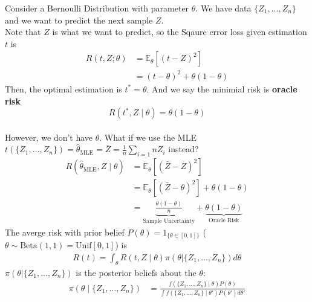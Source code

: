 \documentclass[11pt]{elegantbook}
\begin{document}
\begin{example}\label{ex:square_loss}
    Consider a Bernoulli Distribution with parameter $\theta$. We have data $\{Z_1,...,Z_n\}$ and we want to predict the next sample $Z$.\\
    Note that $Z$ is what we want to predict, so the Sqaure error loss given estimation $t$ is
    \begin{equation}
        \begin{aligned}
            R(t,Z;\theta)&=\mathbb{E}_\theta[(t-Z)^2]\\
            &=(t-\theta)^2+\theta(1-\theta)
        \end{aligned}
        \nonumber
    \end{equation}
    Then, the optimal estimation is $t^*=\theta$. And we say the minimial risk is \textbf{oracle risk} $$R(t^*,Z\mid\theta)=\theta(1-\theta)$$\\
    However, we don't have $\theta$. What if we use the MLE $t(\{Z_1,...,Z_n\})=\hat{\theta}_\text{MLE}=\bar{Z}=\frac{1}{n}\sum_{i=1}{n}Z_i$ instead?
    \begin{equation}
        \begin{aligned}
            R(\hat{\theta}_\text{MLE},Z\mid \theta)&=\mathbb{E}_\theta[(\bar{Z}-Z)^2]\\
            &=\mathbb{E}_\theta[(\bar{Z}-\theta)^2]+\theta(1-\theta)\\
            &=\underbrace{\frac{\theta(1-\theta)}{n}}_\text{Sample Uncertainty}+\underbrace{\theta(1-\theta)}_\text{Oracle Risk}
        \end{aligned}
        \nonumber
    \end{equation}
    The averge risk with prior belief $P(\theta)=1_{\{\theta\in[0,1]\}}$ ($\theta\sim \text{Beta}(1,1)=\text{Unif}[0,1]$) is
    \begin{equation}
        \begin{aligned}
            R(t)=\int_\theta R(t,Z\mid \theta) \pi(\theta| \{Z_1,...,Z_n\}) d\theta
        \end{aligned}
        \nonumber
    \end{equation}
    $\pi(\theta| \{Z_1,...,Z_n\})$ is the posterior beliefs about the $\theta$:
    \begin{equation}
        \begin{aligned}
            \pi(\theta\mid \{Z_1,...,Z_n\})&=\frac{f(\{Z_1,...,Z_n\}\mid \theta)P(\theta)}{\int f(\{Z_1,...,Z_n\}\mid \theta')P(\theta')d\theta'}
        \end{aligned}

\end{equation}
\end{example}
\end{document}
